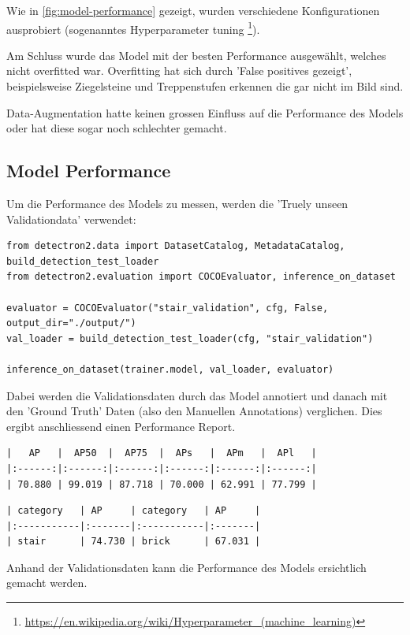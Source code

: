 Wie in \ref{fig:model-performance} gezeigt, wurden verschiedene Konfigurationen ausprobiert 
(sogenanntes Hyperparameter tuning \footnote{\url{https://en.wikipedia.org/wiki/Hyperparameter_(machine_learning)}}).

Am Schluss wurde das Model mit der besten Performance ausgewählt, welches nicht overfitted war.
Overfitting hat sich durch 'False positives gezeigt', beispielsweise Ziegelsteine und Treppenstufen erkennen die gar nicht im
Bild sind.

Data-Augmentation \cite{perez2017effectiveness} hatte keinen grossen Einfluss auf die Performance des Models
oder hat diese sogar noch schlechter gemacht.

\subsection{Model Performance}

Um die Performance des Models zu messen, werden die 'Truely unseen Validationdata' verwendet:

\begin{verbatim}
from detectron2.data import DatasetCatalog, MetadataCatalog, build_detection_test_loader
from detectron2.evaluation import COCOEvaluator, inference_on_dataset

evaluator = COCOEvaluator("stair_validation", cfg, False, output_dir="./output/")
val_loader = build_detection_test_loader(cfg, "stair_validation")

inference_on_dataset(trainer.model, val_loader, evaluator)
\end{verbatim}

Dabei werden die Validationsdaten durch das Model annotiert und danach mit den 'Ground Truth' Daten 
(also den Manuellen Annotations) verglichen. Dies ergibt anschliessend einen Performance Report.

\begin{verbatim}
|   AP   |  AP50  |  AP75  |  APs   |  APm   |  APl   |
|:------:|:------:|:------:|:------:|:------:|:------:|
| 70.880 | 99.019 | 87.718 | 70.000 | 62.991 | 77.799 |
\end{verbatim}

\begin{verbatim}
| category   | AP     | category   | AP     |
|:-----------|:-------|:-----------|:-------|
| stair      | 74.730 | brick      | 67.031 |
\end{verbatim}

Anhand der Validationsdaten kann die Performance des Models ersichtlich gemacht werden.

